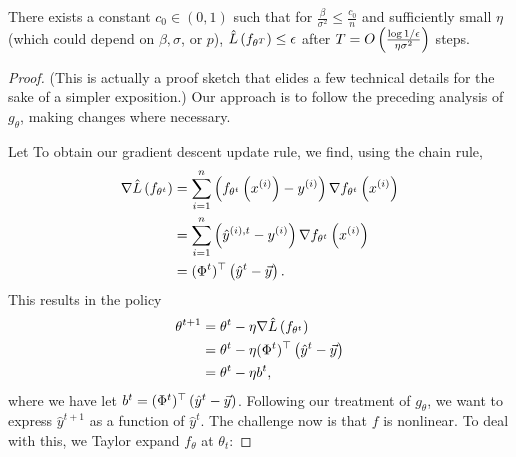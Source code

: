 \begin{theorem}
There exists a constant $c_0 \in (0, 1)$ such that for $\frac{\beta}{\sigma^2} \leq \frac{c_0}{n}$ and sufficiently small $\eta$ (which could depend on $\beta, \sigma$, or $p$), $\hat{L}\left(f_{\theta^T}\right) \leq \epsilon$ after $T = O \left(\frac{\log 1/\epsilon}{\eta\sigma^2}\right)$ steps. \label{lec14:thm:optimization_f} 
\end{theorem}

\begin{proof}

(This is actually a proof sketch that elides a few technical details for the sake of a simpler exposition.) Our approach is to follow the preceding analysis of $g_\theta$, making changes where necessary.

Let  
To obtain our gradient descent update rule, we find, using the chain rule,
\begin{align}
    \nabla \hat{L}\left(f_{\theta^t}\right) &=  \sum_{i=1}^n\left(f_{\theta^t}\left(x^{(i)}\right) - y^{(i)}\right)\nabla f_{\theta^t}\left(x^{(i)}\right) \\ 
    &=  \sum_{i=1}^n\left(\hat{y}^{(i), t} - y^{(i)}\right)\nabla f_{\theta^t}\left(x^{(i)}\right) \\
    &= (\Phi^t)^\top\left(\hat{y}^t - \vec{y}\right).
\end{align}
This results in the policy
\begin{align}
    \theta^{t+1} &= \theta^t - \eta \nabla \hat{L}\left(f_{\theta^t}\right) \\
    &= \theta^t - \eta (\Phi^t)^\top\left(\hat{y}^t - \vec{y}\right) \\ 
    &= \theta^t - \eta b^t,
\end{align}
where we have let $b^t = (\Phi^t)^\top\left(\hat{y}^t - \vec{y}\right)$. Following our treatment of $g_\theta$, we want to express $\hat{y}^{t+1}$ as a function of $\hat{y}^{t}$. The challenge now is that $f$ is nonlinear. To deal with this, we Taylor expand $f_\theta$ at $\theta_t$:


\end{proof}
